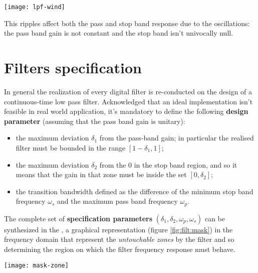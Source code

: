 	\begin{SCfigure}[2][bht]
		\centering \texttt{[image: lpf-wind]}
		\caption{spectral behaviour of low pass filter realised by appropriate windows of length $M$.}
		\label{fig:filt:windowfilter}
	\end{SCfigure}
	
	This ripples affect both the pass and stop band response due to the oscillations: the pass band gain is not constant and the stop band isn't univocally null.
	
\section{Filters specification}
	In general the realization of every digital filter is re-conducted on the design of a continuous-time low pass filter. Acknowledged that an ideal implementation isn't feasible in real world application, it's mandatory to define the following \textbf{design parameter} (assuming that the pass band gain is unitary):
	\begin{itemize}
		\item the maximum deviation $\delta_1$ from the pass-band gain; in particular the realised filter must be bounded in the range $[1-\delta_1,1]$;
		\item the maximum deviation $\delta_2$ from the 0 in the stop band region, and so it means that the gain in that zone must be inside the set $[0,\delta_2]$;
		\item the transition bandwidth defined as the difference of the minimum stop band frequency $\omega_s$ and the maximum pass band frequency $\omega_p$. 
	\end{itemize}
	The complete set of \textbf{specification parameters} $(\delta_1,\delta_2,\omega_p,\omega_s)$ can be synthesized in the , a graphical representation (figure \ref{fig:filt:mask}) in the frequency domain that represent the \textit{untouchable zones} by the filter and so determining the region on which the filter frequency response must behave.
	
	\begin{SCfigure}[2][bht]
		\centering \texttt{[image: mask-zone]}
		\caption{mask created to design a low pass filter.}
		\label{fig:filt:mask}
	\end{SCfigure}
	
